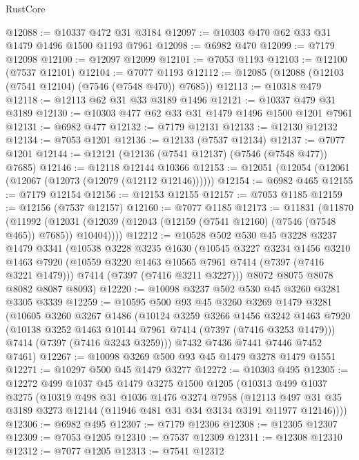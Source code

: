 \begin{lexlean}{RustCore}
\begin{coremodule}
@12088 := @10337 @472 @31 @3184
@12097 := @10303 @470 @62 @33 @31 @1479 @1496 @1500 @1193 @7961
@12098 := @6982 @470
@12099 := @7179 @12098
@12100 := @12097 @12099
@12101 := @7053 @1193
@12103 := @12100 (@7537 @12101)
@12104 := @7077 @1193
@12112 := @12085 (@12088 (@12103 (@7541 @12104) (@7546 (@7548 @470)) @7685))
@12113 := @10318 @479
@12118 := @12113 @62 @31 @33 @3189 @1496
@12121 := @10337 @479 @31 @3189
@12130 := @10303 @477 @62 @33 @31 @1479 @1496 @1500 @1201 @7961
@12131 := @6982 @477
@12132 := @7179 @12131
@12133 := @12130 @12132
@12134 := @7053 @1201
@12136 := @12133 (@7537 @12134)
@12137 := @7077 @1201
@12144 := @12121 (@12136 (@7541 @12137) (@7546 (@7548 @477)) @7685)
@12146 := @12118 @12144 @10366
@12153 := @12051 (@12054 (@12061 (@12067 (@12073 (@12079 (@12112 @12146))))))
@12154 := @6982 @465
@12155 := @7179 @12154
@12156 := @12153 @12155
@12157 := @7053 @1185
@12159 := @12156 (@7537 @12157)
@12160 := @7077 @1185
@12173 := @11831
    (@11870
      (@11992 (@12031 (@12039 (@12043 (@12159 (@7541 @12160) (@7546 (@7548 @465)) @7685)) @10404))))
@12212 := @10528
    @502
    @530
    @45
    @3228
    @3237
    @1479
    @3341
    (@10538
      @3228
      @3235
      @1630
      (@10545
        @3227
        @3234
        @1456
        @3210
        @1463
        @7920
        (@10559 @3220 @1463 @10565 @7961 @7414 (@7397 (@7416 @3221 @1479)))
        @7414
        (@7397 (@7416 @3211 @3227)))
      @8072
      @8075
      @8078
      @8082
      @8087
      @8093)
@12220 := @10098 @3237 @502 @530 @45 @3260 @3281 @3305 @3339
@12259 := @10595
    @500
    @93
    @45
    @3260
    @3269
    @1479
    @3281
    (@10605
      @3260
      @3267
      @1486
      (@10124
        @3259
        @3266
        @1456
        @3242
        @1463
        @7920
        (@10138 @3252 @1463 @10144 @7961 @7414 (@7397 (@7416 @3253 @1479)))
        @7414
        (@7397 (@7416 @3243 @3259)))
      @7432
      @7436
      @7441
      @7446
      @7452
      @7461)
@12267 := @10098 @3269 @500 @93 @45 @1479 @3278 @1479 @1551
@12271 := @10297 @500 @45 @1479 @3277
@12272 := @10303 @495
@12305 := @12272
    @499
    @1037
    @45
    @1479
    @3275
    @1500
    @1205
    (@10313
      @499
      @1037
      @3275
      (@10319
        @498
        @31
        @1036
        @1476
        @3274
        @7958
        (@12113 @497 @31 @35 @3189 @3273 @12144 (@11946 @481 @31 @34 @3134 @3191 @11977 @12146))))
@12306 := @6982 @495
@12307 := @7179 @12306
@12308 := @12305 @12307
@12309 := @7053 @1205
@12310 := @7537 @12309
@12311 := @12308 @12310
@12312 := @7077 @1205
@12313 := @7541 @12312

\end{coremodule}
\end{lexlean}
